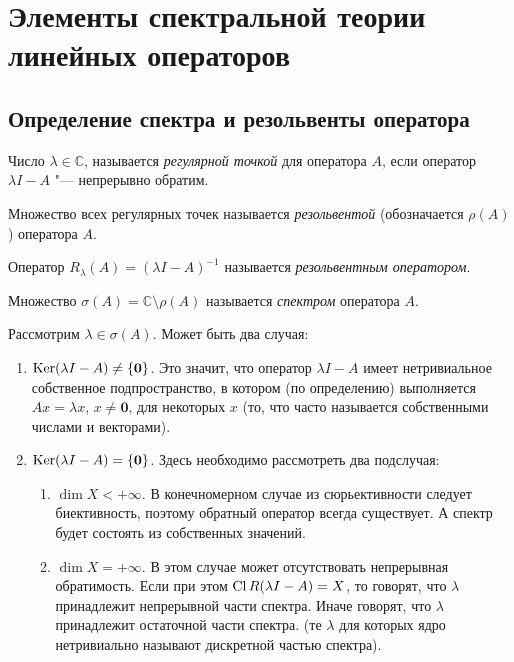 \section{Элементы спектральной теории линейных операторов}

\subsection{Определение спектра и резольвенты оператора}

\begin{definition}
	Число $\lambda \in \mathbb{C}$, называется \textit{регулярной точкой}
	для оператора $A$, если оператор $\lambda I - A$ "--- непрерывно обратим.
\end{definition}

\begin{definition}[резольвента]
	Множество всех регулярных точек называется \textit{резольвентой} (обозначается $\rho(A)$)
	оператора $A$.
\end{definition}

\begin{definition}
	Оператор $R_\lambda(A) = \left( \lambda I - A\right)^{-1}$ называется 
	\textit{резольвентным оператором}.
\end{definition}

\begin{definition}[спектр]
	Множество $\sigma(A) = \mathbb{C} \setminus \rho(A)$ называется 
	\textit{спектром} оператора $A$.
\end{definition}

Рассмотрим $\lambda \in \sigma(A)$. Может быть два случая:
\begin{enumerate}
	\item
	$\operatorname{Ker} (\lambda I - A) \neq \left\{ \boldsymbol{0}\right\}$. Это значит, что оператор 
	$\lambda I - A$ имеет нетривиальное собственное подпространство, в котором (по определению)
	выполняется $Ax=\lambda x$, $x \neq \boldsymbol{0}$, для некоторых $x$
	(то, что часто называется собственными числами и векторами).
	\item
	$\operatorname{Ker} (\lambda I - A) = \left\{ \boldsymbol{0}\right\}$. 
	Здесь необходимо рассмотреть два подслучая:
	\begin{enumerate}
		\item
		$\dim X < +\infty$. В конечномерном случае из сюрьективности следует
		биективность, поэтому обратный оператор всегда существует.
		А спектр будет состоять из собственных значений.
		\item
		$\dim X = +\infty$. В этом случае может отсутствовать непрерывная обратимость.
		Если при этом $\operatorname{Cl} R(\lambda I - A) = X$, то говорят, что $\lambda$ 
		принадлежит непрерывной части спектра. Иначе говорят, что
		$\lambda$ принадлежит остаточной части спектра.
		(те $\lambda$ для которых ядро нетривиально называют дискретной частью спектра).
	\end{enumerate}
\end{enumerate}
